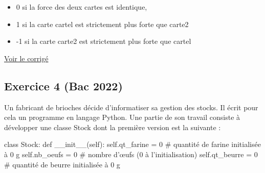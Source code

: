 \documentclass[
  letterpaper,
  DIV=11,
  numbers=noendperiod]{scrartcl}
\newenvironment{Shaded}{\begin{snugshade}}{\end{snugshade}}
\newcommand{\CommentTok}[1]{\textcolor[rgb]{0.37,0.37,0.37}{#1}}
\newcommand{\DecValTok}[1]{\textcolor[rgb]{0.68,0.00,0.00}{#1}}
\newcommand{\FunctionTok}[1]{\textcolor[rgb]{0.28,0.35,0.67}{#1}}
\newcommand{\KeywordTok}[1]{\textcolor[rgb]{0.00,0.23,0.31}{#1}}
\newcommand{\NormalTok}[1]{\textcolor[rgb]{0.00,0.23,0.31}{#1}}
\newcommand{\OperatorTok}[1]{\textcolor[rgb]{0.37,0.37,0.37}{#1}}
\newcommand{\VariableTok}[1]{\textcolor[rgb]{0.07,0.07,0.07}{#1}}
\providecommand{\tightlist}{%
  \setlength{\itemsep}{0pt}\setlength{\parskip}{0pt}}\usepackage{longtable,booktabs,array}
\begin{document}
\begin{enumerate}
  \begin{itemize}
  \tightlist
  \item
    0 si la force des deux cartes est identique,
  \item
    1 si la carte cartel est strictement plus forte que carte2
  \item
    -1 si la carte carte2 est strictement plus forte que cartel
  \end{itemize}
\end{enumerate}

\href{https://flallemand.fr/notebook/?from=https://flallemand.fr/nsi/assets/notebooks/exo3_POO_CORR.ipynb}{Voir
le corrigé}

\hypertarget{fa-solid-pencil-alt-exercice-4-bac-2022}{%
\subsection{\texorpdfstring{ Exercice 4 (Bac
2022)}{ Exercice 4 (Bac 2022)}}\label{fa-solid-pencil-alt-exercice-4-bac-2022}}

Un fabricant de brioches décide d'informatiser sa gestion des stocks. Il
écrit pour cela un programme en langage Python. Une partie de son
travail consiste à développer une classe Stock dont la première version
est la suivante :

\begin{Shaded}
\begin{Highlighting}[]
\KeywordTok{class}\NormalTok{ Stock:}
    \KeywordTok{def} \FunctionTok{\_\_init\_\_}\NormalTok{(}\VariableTok{self}\NormalTok{):}
        \VariableTok{self}\NormalTok{.qt\_farine }\OperatorTok{=} \DecValTok{0} \CommentTok{\# quantité de farine initialisée à 0 g}
        \VariableTok{self}\NormalTok{.nb\_oeufs }\OperatorTok{=} \DecValTok{0} \CommentTok{\# nombre d’œufs (0 à l’initialisation)}
        \VariableTok{self}\NormalTok{.qt\_beurre }\OperatorTok{=} \DecValTok{0} \CommentTok{\# quantité de beurre initialisée à 0 g}
\end{Highlighting}
\end{Shaded}
\end{document}
